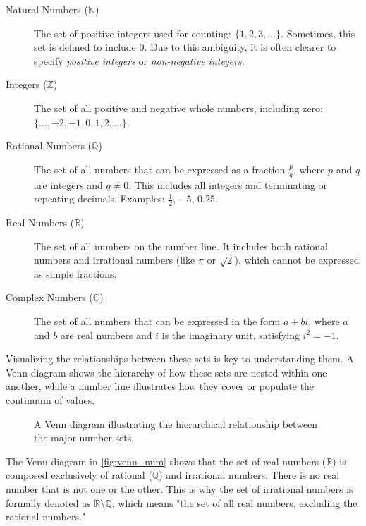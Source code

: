 \begin{description}
    \item[Natural Numbers ($\mathbb{N}$)] The set of positive integers used for counting: $\{1, 2, 3, \dots\}$. Sometimes, this set is defined to include $0$. Due to this ambiguity, it is often clearer to specify \textit{positive integers} or \textit{non-negative integers}.

    \item[Integers ($\mathbb{Z}$)] The set of all positive and negative whole numbers, including zero: $\{\dots, -2, -1, 0, 1, 2, \dots\}$.

    \item[Rational Numbers ($\mathbb{Q}$)] The set of all numbers that can be expressed as a fraction $\frac{p}{q}$, where $p$ and $q$ are integers and $q \neq 0$. This includes all integers and terminating or repeating decimals. Examples: $\frac{1}{2}$, $-5$, $0.25$.

    \item[Real Numbers ($\mathbb{R}$)] The set of all numbers on the number line. It includes both rational numbers and irrational numbers (like $\pi$ or $\sqrt{2}$), which cannot be expressed as simple fractions.
    
    \item[Complex Numbers ($\mathbb{C}$)] The set of all numbers that can be expressed in the form $a + bi$, where $a$ and $b$ are real numbers and $i$ is the imaginary unit, satisfying $i^2 = -1$.
\end{description}

Visualizing the relationships between these sets is key to understanding them. A Venn diagram shows the hierarchy of how these sets are nested within one another, while a number line illustrates how they cover or populate the continuum of values.

\begin{figure}[htbp]
    \centering
    
    \caption{A Venn diagram illustrating the hierarchical relationship between the major number sets.}
    \label{fig:venn_num}
\end{figure}

\begin{remark}
    The Venn diagram in \autoref{fig:venn_num} shows that the set of real numbers ($\mathbb{R}$) is composed exclusively of rational ($\mathbb{Q}$) and irrational numbers. There is no real number that is not one or the other. This is why the set of irrational numbers is formally denoted as $\mathbb{R} \setminus \mathbb{Q}$, which means "the set of all real numbers, excluding the rational numbers."
\end{remark}


